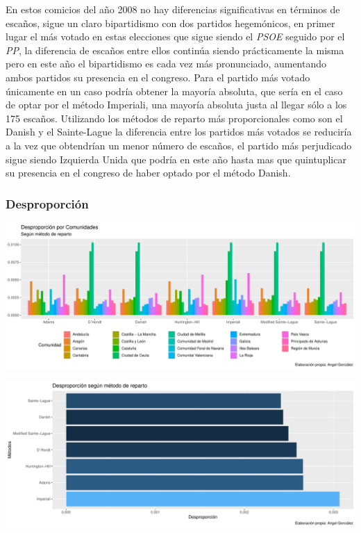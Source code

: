 \documentclass[12pt,a4paper,]{book}
\numberwithin{dummy}{section}
\theoremstyle{ocrenumbox}
\theoremstyle{blacknumex}
\theoremstyle{blacknumbox}
\theoremstyle{ocrenum}
\theoremstyle{ocrenum}
\begin{document}
En estos comicios del año 2008 no hay diferencias significativas en
términos de escaños, sigue un claro bipartidismo con dos partidos
hegemónicos, en primer lugar el más votado en estas elecciones que sigue
siendo el \emph{PSOE} seguido por el \emph{PP}, la diferencia de escaños
entre ellos continúa siendo prácticamente la misma pero en este año el
bipartidismo es cada vez más pronunciado, aumentando ambos partidos su
presencia en el congreso. Para el partido más votado únicamente en un
caso podría obtener la mayoría absoluta, que sería en el caso de optar
por el método Imperiali, una mayoría absoluta justa al llegar sólo a los
175 escaños. Utilizando los métodos de reparto más proporcionales como
son el Danish y el Sainte-Lague la diferencia entre los partidos más
votados se reduciría a la vez que obtendrían un menor número de escaños,
el partido más perjudicado sigue siendo Izquierda Unida que podría en
este año hasta mas que quintuplicar su presencia en el congreso de haber
optado por el método Danish.

\hypertarget{desproporciuxf3n-9}{%
\subsubsection{Desproporción}\label{desproporciuxf3n-9}}

\begin{center}\includegraphics[width=0.95\linewidth]{figurasR/unnamed-chunk-141-1} \end{center}

\begin{center}\includegraphics[width=0.95\linewidth]{figurasR/unnamed-chunk-141-2} \end{center}
\end{document}
